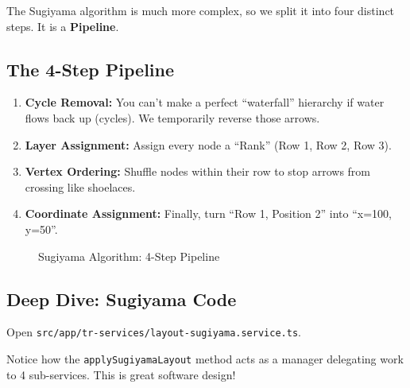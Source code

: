 \documentclass[a4paper,11pt,oneside]{report}
\begin{document}
The Sugiyama algorithm is much more complex, so we split it into four distinct steps. It is a \textbf{Pipeline}.

\subsection{The 4-Step Pipeline}

\begin{enumerate}
    \item \textbf{Cycle Removal:} You can't make a perfect ``waterfall'' hierarchy if water flows back up (cycles). We temporarily reverse those arrows.
    \item \textbf{Layer Assignment:} Assign every node a ``Rank'' (Row 1, Row 2, Row 3).
    \item \textbf{Vertex Ordering:} Shuffle nodes within their row to stop arrows from crossing like shoelaces.
    \item \textbf{Coordinate Assignment:} Finally, turn ``Row 1, Position 2'' into ``x=100, y=50''.
\end{enumerate}

\begin{figure}[H]
\centering
{}
\caption{Sugiyama Algorithm: 4-Step Pipeline}
\label{fig:sugiyama-pipeline}
\end{figure}

\subsection{Deep Dive: Sugiyama Code}

Open \texttt{src/app/tr-services/layout-sugiyama.service.ts}.

Notice how the \texttt{applySugiyamaLayout} method acts as a manager delegating work to 4 sub-services. This is great software design!
\end{document}
